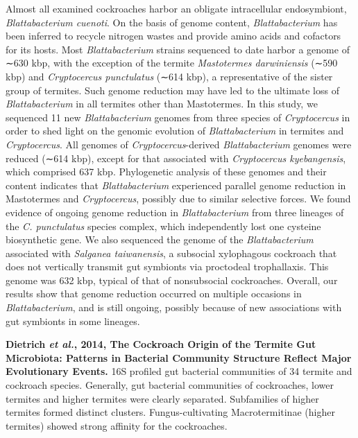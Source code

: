 \documentclass[11pt]{article}
\begin{document}
\begin{sloppypar}
Almost all examined cockroaches harbor an obligate intracellular endosymbiont, \textit{Blattabacterium cuenoti}. 
On the basis of genome content, \textit{Blattabacterium} has been inferred to recycle nitrogen wastes and provide amino acids and cofactors for its hosts. 
Most \textit{Blattabacterium} strains sequenced to date harbor a genome of ∼630 kbp, with the exception of the termite \textit{Mastotermes darwiniensis} (∼590 kbp) and \textit{Cryptocercus punctulatus} (∼614 kbp), a representative of the sister group of termites. 
Such genome reduction may have led to the ultimate loss of \textit{Blattabacterium} in all termites other than Mastotermes. 
In this study, we sequenced 11 new \textit{Blattabacterium} genomes from three species of \textit{Cryptocercus} in order to shed light on the genomic evolution of \textit{Blattabacterium} in termites and \textit{Cryptocercus}. 
All genomes of \textit{Cryptocercus}-derived \textit{Blattabacterium} genomes were reduced (∼614 kbp), except for that associated with \textit{Cryptocercus kyebangensis}, which comprised 637 kbp. 
Phylogenetic analysis of these genomes and their content indicates that \textit{Blattabacterium} experienced parallel genome reduction in Mastotermes and \textit{Cryptocercus}, possibly due to similar selective forces. 
We found evidence of ongoing genome reduction in \textit{Blattabacterium} from three lineages of the \textit{C. punctulatus} species complex, which independently lost one cysteine biosynthetic gene. 
We also sequenced the genome of the \textit{Blattabacterium} associated with \textit{Salganea taiwanensis}, a subsocial xylophagous cockroach that does not vertically transmit gut symbionts via proctodeal trophallaxis. 
This genome was 632 kbp, typical of that of nonsubsocial cockroaches. 
Overall, our results show that genome reduction occurred on multiple occasions in \textit{Blattabacterium}, and is still ongoing, possibly because of new associations with gut symbionts in some lineages.
\par
\textbf{Dietrich \textit{et al.}, 2014, The Cockroach Origin of the Termite Gut Microbiota: Patterns in Bacterial Community Structure Reflect Major Evolutionary Events.} \newline
16S profiled gut bacterial communities of 34 termite and cockroach species. 
Generally, gut bacterial communities of cockroaches, lower termites and higher termites were clearly separated. 
Subfamilies of higher termites formed distinct clusters. 
Fungus-cultivating Macrotermitinae (higher termites) showed strong affinity for the cockroaches.

\end{sloppypar}
\end{document}
